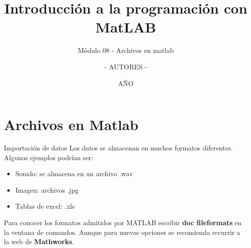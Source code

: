 \documentclass{bredelebeamer}
\title[Programación en MatLAB]{Introducción a la programación con MatLAB}
\subtitle{Módulo 08 - Archivos en matlab}
\author{- AUTORES - \inst{1}}
\institute[UNIVERSIDAD]
{
  \inst{1}%
  - NOMBRE UNIVERSIDAD - 
  }
\date{AÑO}
\begin{document}
\begin{frame}
  \titlepage 
\end{frame}



\section{Archivos en Matlab}

\begin{frame}{Importación de datos}
Los datos se almacenan en muchos formatos diferentes. Algunos ejemplos podrían ser:
\begin{itemize}
\item Sonido: se almacena en un archivo .wav
\item Imagen: archivos .jpg
\item Tablas de excel: .xls
\end{itemize}
Para conocer los formatos admitidos por MATLAB escribir \textbf{doc fileformats} en la ventana de comandos. Aunque para nuevas opciones se recomienda recurrir a la web de \textbf{Mathworks}.
\end{frame}
\end{document}
